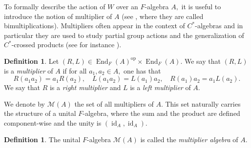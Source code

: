 \documentclass[reqno]{amsart}
\theoremstyle{definition}
\newtheorem{definition}[theorem]{Definition}
\newtheorem{remark}[theorem]{Remark}
\numberwithin{equation}{section}
\numberwithin{theorem}{section}
\DeclareMathOperator{\id}{id}
\DeclareMathOperator{\End}{End}
\newcommand{\M}{\mathcal{M}}
\DeclareMathOperator{\op}{op}
\newcommand{\blue}{\color{blue}}
\newcommand{\black}{\color{black}}
\begin{document}


To formally describe the action of $W$ over an $F$-algebra $A,$ it is useful to introduce the notion of multiplier of $A$ (see \cite{MacLane1958}, where they are called bimultiplications).
Multipliers often appear in the context of $C^*$-algebras and in particular they are used to study partial group actions and the generalization of $C^*$-crossed products (see for instance \cite{DokuchaevExel2004, DokuchaevDelRioSimon2007}).

\begin{definition}
    Let $(R,L)\in\End_F(A)^{\op} \times \End_F(A).$  We say that $(R,L)$ is a  \emph{multiplier} of $A$ if for all $a_1,a_2\in A,$ one has that
    \begin{equation}\label{condition multiplier}
        R(a_1 a_2)= a_1R(a_2), \quad  L(a_1a_2)= L(a_1)a_2, \quad R(a_1)a_2=a_1L(a_2).
    \end{equation}
    We say that $R $ is a \emph{right multiplier} and $L$ is a \emph{left multiplier} of $A.$
\end{definition}


We denote by $\M(A)$ the set of all multipliers of $A$.
This set naturally carries the structure of a unital
$F$-algebra, where the sum and the product are defined component-wise and the unity is $(\id_A, \id_A).$


\begin{definition}
    The unital $F$-algebra $\M(A)$ is called the \emph{multiplier algebra} of $A.$
\end{definition}
\end{document}
